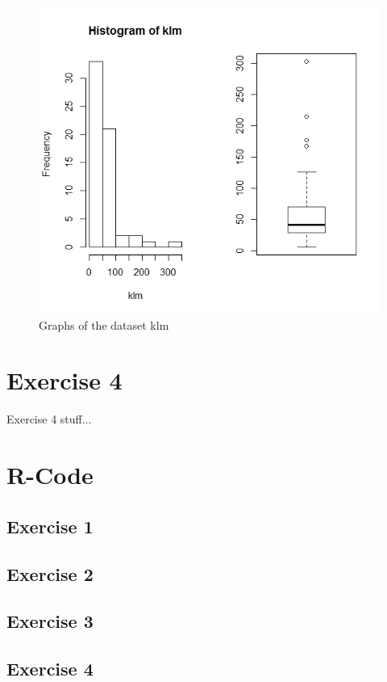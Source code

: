 \documentclass{article}
\begin{document}
    \begin{figure}
      \includegraphics[scale=0.6]{../results/resultKLM.png}
      \caption{Graphs of the dataset klm}
      \label{fig:GraphKLM}
    \end{figure}

  \section{Exercise 4}
    Exercise 4 stuff...

  \section{R-Code}
    \subsection{Exercise 1}\label{sec:RE1}
    \subsection{Exercise 2}\label{sec:RE2}
    \subsection{Exercise 3}\label{sec:RE3}
    \subsection{Exercise 4}\label{sec:RE4}
\end{document}

